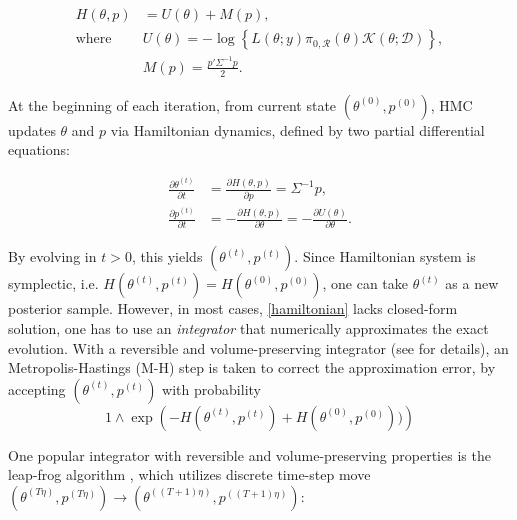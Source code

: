 \documentclass[10pt]{article}
\newcommand{\mc}[1]{\mathcal{#1}}
\DeclareMathOperator{\1}{\mathbbm{1}}
\begin{document}

\begin{equation}
\begin{aligned}
H(\theta, p)& = U(\theta)+M(p),\\
\text{where } & U(\theta) = -\log\left\{ L(\theta;y)\pi_{0,\mc R}(\theta) \mc{K}(\theta;\mc D) \right\},\\
& M(p) = \frac{p'\Sigma^{-1} p}{2}.
\end{aligned}
\end{equation}

At the beginning of each iteration, from current state $(\theta^{(0)},p^{(0)})$, HMC updates $\theta$ and $p$ via Hamiltonian dynamics, defined by two partial differential equations:

\begin{equation}
\begin{aligned}
\label{hamiltonian}
\frac{\partial \theta ^{(t)}}{\partial t} & =\frac{\partial H(\theta, p)}{\partial p} = \Sigma^{-1}p,\\
\frac{\partial p^{(t)}}{\partial t}& =-\frac{\partial H(\theta, p)}{\partial \theta} = -\frac{\partial U(\theta)}{\partial \theta}.
\end{aligned}
\end{equation}

By evolving in $t>0$, this yields $(\theta^{(t)},p^{(t)})$. Since Hamiltonian system is symplectic, i.e. $H(\theta^{(t)},p^{(t)})=H(\theta^{(0)},p^{(0)})$, one can take $\theta^{(t)}$ as a new posterior sample. However, in most cases, \eqref{hamiltonian} lacks closed-form solution, one has to use an {\it integrator} that numerically approximates the exact evolution. With a reversible and volume-preserving  integrator (see \citep{neal2011mcmc} for details), an Metropolis-Hastings (M-H) step is taken to correct the approximation error, by accepting $(\theta^{(t)},p^{(t)})$ with probability 
$$1\wedge \exp  \left( - H(\theta^{(t)},p^{(t)}) + H(\theta^{(0)},p^{(0)}))\right)$$

One popular integrator with reversible and volume-preserving properties is the leap-frog algorithm \citep{neal2011mcmc}, which utilizes discrete time-step move $(\theta^{(T\eta)}, p^{(T\eta)}) \rightarrow (\theta^{((T+1)\eta)}, p^{((T+1)\eta)})$:
\end{document}
